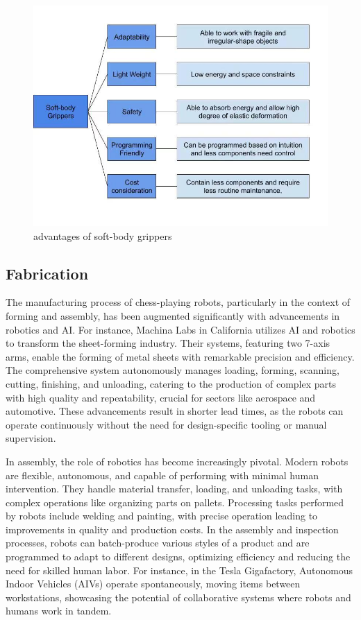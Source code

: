 \documentclass[10pt, a4paper, twocolumn]{article}
\begin{document}
\begin{figure}
    \centering
    \includegraphics[width=1\linewidth]{advantages of soft-body grippers.jpg}
    \caption{advantages of soft-body grippers}
    \label{fig:advantages of soft-body grippers}
\end{figure}

\subsection{Fabrication}
The manufacturing process of chess-playing robots, particularly in the context of forming and assembly, has been augmented significantly with advancements in robotics and AI. For instance, Machina Labs in California utilizes AI and robotics to transform the sheet-forming industry. Their systems, featuring two 7-axis arms, enable the forming of metal sheets with remarkable precision and efficiency\cite{Khalid2023}. The comprehensive system autonomously manages loading, forming, scanning, cutting, finishing, and unloading, catering to the production of complex parts with high quality and repeatability, crucial for sectors like aerospace and automotive. These advancements result in shorter lead times, as the robots can operate continuously without the need for design-specific tooling or manual supervision\cite{harfoush2021application}.

In assembly, the role of robotics has become increasingly pivotal. Modern robots are flexible, autonomous, and capable of performing with minimal human intervention. They handle material transfer, loading, and unloading tasks, with complex operations like organizing parts on pallets. Processing tasks performed by robots include welding and painting, with precise operation leading to improvements in quality and production costs. In the assembly and inspection processes, robots can batch-produce various styles of a product and are programmed to adapt to different designs, optimizing efficiency and reducing the need for skilled human labor. For instance, in the Tesla Gigafactory, Autonomous Indoor Vehicles (AIVs) operate spontaneously, moving items between workstations, showcasing the potential of collaborative systems where robots and humans work in tandem\cite{RobotsNet2019}.
\end{document}
